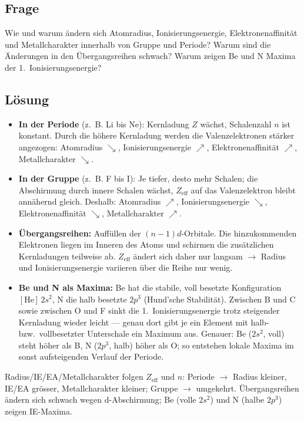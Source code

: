 
\subsection*{Frage}
Wie und warum ändern sich Atomradius, Ionisierungsenergie, Elektronenaffinität
und Metallcharakter innerhalb von Gruppe und Periode? Warum sind die Änderungen
in den Übergangsreihen schwach? Warum zeigen Be und N Maxima der 1.\
Ionisierungsenergie?

\subsection*{Lösung}
\begin{itemize}
  \item \textbf{In der Periode} (z.\ B. Li bis Ne): Kernladung $Z$ wächst,
    Schalenzahl $n$ ist konstant. Durch die höhere Kernladung werden die
    Valenzelektronen stärker angezogen:
    Atomradius $\searrow$, Ionisierungsenergie $\nearrow$, Elektronenaffinität
    $\nearrow$, Metallcharakter $\searrow$.
  \item \textbf{In der Gruppe} (z.\ B. F bis I): Je tiefer, desto mehr Schalen;
    die Abschirmung durch innere Schalen wächst, $Z_{\mathrm{eff}}$ auf das
    Valenzelektron bleibt annähernd gleich. Deshalb: Atomradius $\nearrow$,
    Ionisierungsenergie $\searrow$, Elektronenaffinität $\searrow$,
    Metallcharakter $\nearrow$.
  \item \textbf{Übergangsreihen:} Auffüllen der $(n-1)d$-Orbitale. Die
    hinzukommenden Elektronen liegen im Inneren des Atoms und schirmen die
    zusätzlichen Kernladungen teilweise ab. $Z_{\mathrm{eff}}$ ändert sich daher
    nur langsam $\to$ Radius und Ionisierungsenergie variieren über die Reihe
    nur wenig.
  \item \textbf{Be und N als Maxima:} Be hat die stabile, voll besetzte
    Konfiguration $[\mathrm{He}]\,2s^2$, N die halb besetzte $2p^3$ (Hund'sche
    Stabilität). Zwischen B und C sowie zwischen O und F sinkt die 1.\
    Ionisierungsenergie trotz steigender Kernladung wieder leicht --- genau dort
    gibt je ein Element mit halb- bzw.\ vollbesetzter Unterschale ein Maximum aus.
    Genauer: Be ($2s^2$, voll) steht höher als B, N ($2p^3$, halb) höher als
    O; so entstehen lokale Maxima im sonst aufsteigenden Verlauf der Periode.
\end{itemize}

\begin{ergebnis}
Radius/IE/EA/Metallcharakter folgen $Z_{\mathrm{eff}}$ und $n$: Periode $\to$
Radius kleiner, IE/EA grösser, Metallcharakter kleiner; Gruppe $\to$ umgekehrt.
Übergangsreihen ändern sich schwach wegen d-Abschirmung; Be (volle $2s^2$) und
N (halbe $2p^3$) zeigen IE-Maxima.
\end{ergebnis}

